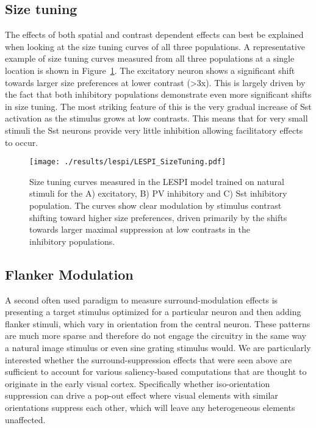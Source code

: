 \subsection{Size tuning}

The effects of both spatial and contrast dependent effects can best be
explained when looking at the size tuning curves of all three
populations. A representative example of size tuning curves measured
from all three populations at a single location is shown in
Figure~\ref{LESPI_SizeTuning}. The excitatory neuron shows a
significant shift towards larger size preferences at lower contrast
(>3x). This is largely driven by the fact that both inhibitory
populations demonstrate even more significant shifts in size
tuning. The most striking feature of this is the very gradual increase
of Sst activation as the stimulus grows at low contrasts. This means
that for very small stimuli the Sst neurons provide very little
inhibition allowing facilitatory effects to occur.

\begin{figure}
	\centering
        \texttt{[image: ./results/lespi/LESPI\_SizeTuning.pdf]}
	\caption[Size tuning curves of the excitatory, PV and Sst
      population at various contrasts.]{Size tuning curves measured in
      the LESPI model trained on natural stimuli for the A)
      excitatory, B) PV inhibitory and C) Sst inhibitory
      population. The curves show clear modulation by stimulus
      contrast shifting toward higher size preferences, driven
      primarily by the shifts towards larger maximal suppression at
      low contrasts in the inhibitory populations.}
	\label{LESPI_SizeTuning}
\end{figure}

\subsection{Flanker Modulation}

A second often used paradigm to measure surround-modulation effects is
presenting a target stimulus optimized for a particular neuron and
then adding flanker stimuli, which vary in orientation from the
central neuron. These patterns are much more sparse and therefore do
not engage the circuitry in the same way a natural image stimulus or
even sine grating stimulus would. We are particularly interested
whether the surround-suppression effects that were seen above are
sufficient to account for various saliency-based computations that are
thought to originate in the early visual cortex. Specifically whether
iso-orientation suppression can drive a pop-out effect where visual
elements with similar orientations suppress each other, which will
leave any heterogeneous elements unaffected.

